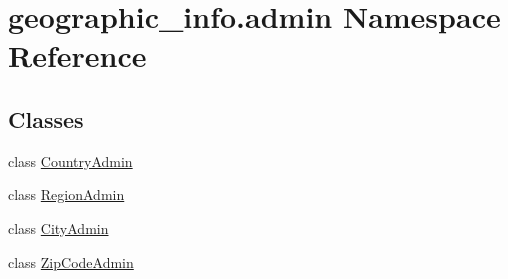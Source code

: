 \hypertarget{namespacegeographic__info_1_1admin}{\section{geographic\-\_\-info.\-admin Namespace Reference}
\label{namespacegeographic__info_1_1admin}
}
\subsection*{Classes}
\begin{DoxyCompactItemize}
\item 
class \hyperlink{classgeographic__info_1_1admin_1_1_country_admin}{Country\-Admin}
\item 
class \hyperlink{classgeographic__info_1_1admin_1_1_region_admin}{Region\-Admin}
\item 
class \hyperlink{classgeographic__info_1_1admin_1_1_city_admin}{City\-Admin}
\item 
class \hyperlink{classgeographic__info_1_1admin_1_1_zip_code_admin}{Zip\-Code\-Admin}
\end{DoxyCompactItemize}
